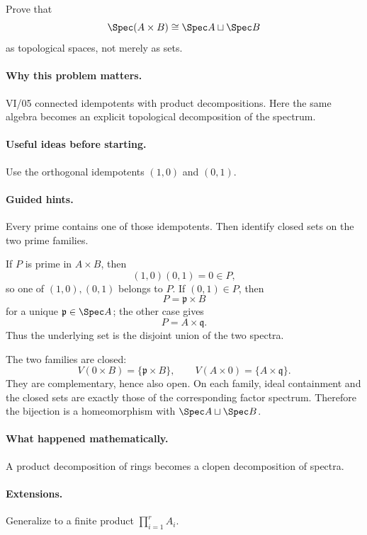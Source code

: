 \begin{problem}
Prove that
\[
\Spec(A\times B)\cong\Spec A\sqcup\Spec B
\]
as topological spaces, not merely as sets.
\end{problem}

\paragraph{Why this problem matters.}
VI/05 connected idempotents with product decompositions.  Here the same algebra becomes an
explicit topological decomposition of the spectrum.

\paragraph{Useful ideas before starting.}
Use the orthogonal idempotents $(1,0)$ and $(0,1)$.

\paragraph{Guided hints.}
Every prime contains one of those idempotents.  Then identify closed sets on the two prime
families.

\begin{solution}
If $P$ is prime in $A\times B$, then
\[
(1,0)(0,1)=0\in P,
\]
so one of $(1,0),(0,1)$ belongs to $P$.  If $(0,1)\in P$, then
\[
P=\mathfrak p\times B
\]
for a unique $\mathfrak p\in\Spec A$; the other case gives
\[
P=A\times\mathfrak q.
\]
Thus the underlying set is the disjoint union of the two spectra.

The two families are closed:
\[
V(0\times B)=\{\mathfrak p\times B\},
\qquad
V(A\times0)=\{A\times\mathfrak q\}.
\]
They are complementary, hence also open.  On each family, ideal containment and the closed
sets are exactly those of the corresponding factor spectrum.  Therefore the bijection is a
homeomorphism with $\Spec A\sqcup\Spec B$.
\end{solution}

\paragraph{What happened mathematically.}
A product decomposition of rings becomes a clopen decomposition of spectra.

\paragraph{Extensions.}
Generalize to a finite product $\prod_{i=1}^r A_i$.
